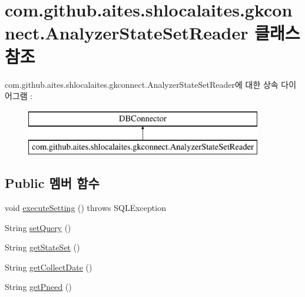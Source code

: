 \hypertarget{classcom_1_1github_1_1aites_1_1shlocalaites_1_1gkconnect_1_1_analyzer_state_set_reader}{}\section{com.\+github.\+aites.\+shlocalaites.\+gkconnect.\+Analyzer\+State\+Set\+Reader 클래스 참조}
\label{classcom_1_1github_1_1aites_1_1shlocalaites_1_1gkconnect_1_1_analyzer_state_set_reader}
com.\+github.\+aites.\+shlocalaites.\+gkconnect.\+Analyzer\+State\+Set\+Reader에 대한 상속 다이어그램 \+: \begin{figure}[H]
\begin{center}
\leavevmode
\includegraphics[height=2.000000cm]{classcom_1_1github_1_1aites_1_1shlocalaites_1_1gkconnect_1_1_analyzer_state_set_reader}
\end{center}
\end{figure}
\subsection*{Public 멤버 함수}
\begin{DoxyCompactItemize}
\item 
void \mbox{\hyperlink{classcom_1_1github_1_1aites_1_1shlocalaites_1_1gkconnect_1_1_analyzer_state_set_reader_a3438390e246978cc7c618d41be8b62d5}{execute\+Setting}} ()  throws S\+Q\+L\+Exception 
\item 
String \mbox{\hyperlink{classcom_1_1github_1_1aites_1_1shlocalaites_1_1gkconnect_1_1_analyzer_state_set_reader_a50fcbaa6fed19b331c64c4af53ba72ce}{set\+Query}} ()
\item 
String \mbox{\hyperlink{classcom_1_1github_1_1aites_1_1shlocalaites_1_1gkconnect_1_1_analyzer_state_set_reader_a1269fceb95b654e22b4eda77039d47d6}{get\+State\+Set}} ()
\item 
String \mbox{\hyperlink{classcom_1_1github_1_1aites_1_1shlocalaites_1_1gkconnect_1_1_analyzer_state_set_reader_a90abb13834ad933cc09a1c89ecafdf66}{get\+Collect\+Date}} ()
\item 
String \mbox{\hyperlink{classcom_1_1github_1_1aites_1_1shlocalaites_1_1gkconnect_1_1_analyzer_state_set_reader_ae974cbeca920a531e20aba6e7e6963e7}{get\+Pneed}} ()
\end{DoxyCompactItemize}


